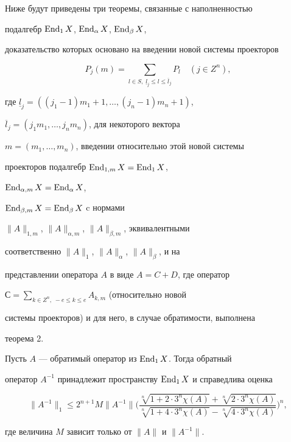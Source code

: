 Ниже будут приведены три теоремы, связанные с наполненностью


подалгебр $\operatorname{End}_1 X$, $\operatorname{End}_\alpha X$, $\operatorname{End}_\beta X$,


доказательство которых основано на введении новой системы проекторов


$$


P_j(m)=\sum_{l\in S,\; \underline{l}_j\le l\le \overline{l}_j}P_l


\quad (j\in Z^n),


$$


где $\underline{l}_j=((j_1-1)m_1+1,\dotsc,(j_n-1)m_n+1)$,


$\overline{l}_j=(j_1 m_1,\dotsc,j_nm_n)$, для некоторого вектора


$m=(m_1,\dotsc,m_n)$, введении относительно этой новой системы


проекторов подалгебр $\operatorname{End}_{1,m} X=\operatorname{End}_1 X$,


$\operatorname{End}_{\alpha,m}X=\operatorname{End}_\alpha X$,


$\operatorname{End}_{\beta,m} X=\operatorname{End}_\beta X$ c нормами


$\|A\|_{1,m}$, $\|A\|_{\alpha,m}$, $\|A\|_{\beta,m}$, эквивалентными


соответственно $\|A\|_1$, $\|A\|_\alpha$, $\|A\|_\beta$, и на


представлении оператора $A$ в виде $A=C+D$, где оператор


$С=\sum\limits_{k\in Z^n,\; -e\le k\le e}A_{k,m}$ (относительно новой


системы проекторов) и для него, в случае обратимости, выполнена


теорема 2.





\begin{thm} Пусть $A$ --- обратимый оператор из  $\operatorname{End}_1 X$. Тогда обратный


оператор $A^{-1}$ принадлежит пространству $\operatorname{End}_1 X$ и справедлива оценка


$$


\|A^{-1}\|_1\le 2^{n+1}M\|A^{-1}\|


\biggl(\frac{\sqrt[n]{1+2\cdot


3^n\chi(A)}+\sqrt[n]{2\cdot 3^n \chi (A)}}


{\sqrt[n]{1+4\cdot 3^n\chi(A)}-


\sqrt[n]{4\cdot 3^n \chi (A)}}\biggr)^n,


$$


где величина $M$ зависит только от $\|A\|$ и $\|A^{-1}\|$.


\end{thm}






